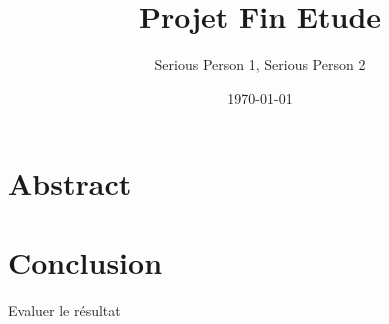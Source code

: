 \documentclass[
 a4paper,
12pt,			%
headsepline
]{report}
\title{Projet Fin Etude}
\author{Serious Person 1, Serious Person 2}
\date{\today}
\begin{document}
	
\maketitle


\chapter*{Abstract} 




\tableofcontents %

\listoffigures %

\listoftables %
	

	




\chapter{Conclusion}
Evaluer le résultat 


\printbibliography[heading=bibintoc]
\end{document}
